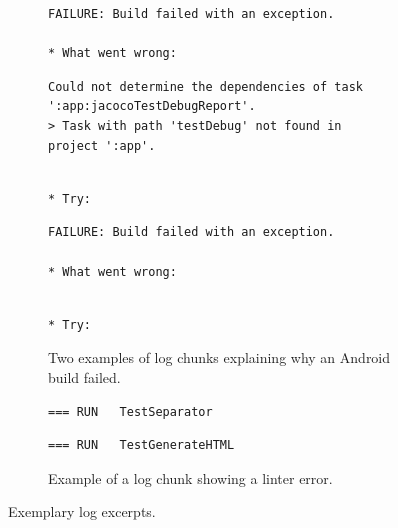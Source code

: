 \documentclass[10pt,journal,compsoc]{IEEEtran}
\begin{document}
\lstset{escapeinside=//}
\begin{figure}[tbp]
  \centering
\begin{subfigure}[tbp]{\columnwidth}
  \begin{lstlisting}[breaklines=true,frame=tlr]
FAILURE: Build failed with an exception.

* What went wrong:
  \end{lstlisting}
  \vspace{-\baselineskip}
  \begin{lstlisting}[backgroundcolor=\color{Cerulean!60},breaklines=true,frame=rl]
Could not determine the dependencies of task ':app:jacocoTestDebugReport'.
> Task with path 'testDebug' not found in project ':app'.
  \end{lstlisting}
  \vspace{-\baselineskip}
  \begin{lstlisting}[breaklines=true,frame=blr]

* Try:
  \end{lstlisting}
\end{subfigure}\hspace{\fill}
\begin{subfigure}[tbp]{\columnwidth}
  \centering
  \begin{lstlisting}[breaklines=true,frame=tlr]
FAILURE: Build failed with an exception.

* What went wrong:
  \end{lstlisting}
  \vspace{-\baselineskip}
  
  \vspace{-\baselineskip}
  \begin{lstlisting}[breaklines=true,frame=blr]

* Try:
  \end{lstlisting}
    \caption{Two examples of log chunks explaining why an Android
  build failed.}
  \label{lst:chunk-example}
\end{subfigure}

\begin{subfigure}[tbp]{\columnwidth}
  \begin{lstlisting}[breaklines=true,frame=tlr]
=== RUN   TestSeparator
  \end{lstlisting}
  \vspace{-\baselineskip}
  
  \vspace{-\baselineskip}
  \begin{lstlisting}[breaklines=true,frame=blr]
=== RUN   TestGenerateHTML
  \end{lstlisting}
  \caption{Example of a log chunk showing a linter error.}
  \label{lst:chunk-example-3}
\end{subfigure}

\caption{Exemplary log excerpts.}
\label{lst:logexamples}
\end{figure}
\end{document}
